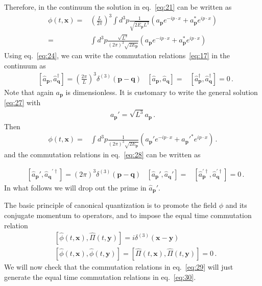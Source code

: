 \begin{frame}
Therefore, in the continuum the solution in eq.~\eqref{eq:21} can be written as
\begin{align}
\label{eq:27}
  \phi(t,\mathbf{x})=&\left(\frac{L}{2\pi}\right)^3\int d^3p \frac{1}{\sqrt{2E_\mathbf{p} L^3}}
  \left(a_\mathbf{p} e^{-i p\cdot x }+a_\mathbf{p}^* e^{i p\cdot x }\right)\nonumber\\
=&\int d^3p \frac{\sqrt{L^3}}{(2\pi)^3\sqrt{2E_\mathbf{p} }}
  \left(a_\mathbf{p} e^{-i p\cdot x }+a_\mathbf{p}^* e^{i p\cdot x }\right)
\end{align}
Using eq.~\eqref{eq:24}, we can write the commutation relations~\eqref{eq:17} in the continuum as
\begin{align}
\label{eq:28}
  &\left[\widehat{a}_\mathbf{p},\widehat{a}_\mathbf{q}^\dagger\right]=
\left(\frac{2\pi}{L}\right)^3\delta^{(3)}(\mathbf{p}-\mathbf{q})
&\left[\widehat{a}_\mathbf{p},\widehat{a}_\mathbf{q}\right]=&
\left[\widehat{a}_\mathbf{p}^\dagger,\widehat{a}_\mathbf{q}^\dagger\right]=0\,.
\end{align}
Note that again $a_{\mathbf{p}}$ is dimensionless. It is customary to write the general solution \eqref{eq:27} with
\begin{align}
  a_{\mathbf{p}}'=\sqrt{L^3}a_{\mathbf{p}}\,.
\end{align}
Then
\begin{align}
  \phi(t,\mathbf{x})=&\int d^3p \frac{1}{(2\pi)^3\sqrt{2E_\mathbf{p} }}
  \left(a_\mathbf{p}' e^{-i p\cdot x }+{a_\mathbf{p}'}^* e^{i p\cdot x }\right)\,.
\end{align}
and the commutation relations in eq.~\eqref{eq:28} can be written as

\begin{align}
\label{eq:29}
  &\left[\widehat{a}_{\mathbf{p}}',{\widehat{a}_{\mathbf{q}}}^{\prime \dagger}\right]=
\left(2\pi\right)^3\delta^{(3)}(\mathbf{p}-\mathbf{q})
&\left[\widehat{a}_{\mathbf{p}}',\widehat{a}_{\mathbf{q}}'\right]=&
\left[\widehat{a}_\mathbf{p}^{\prime\dagger},\widehat{a}_\mathbf{q}^{\prime\dagger}\right]=0\,.
\end{align}
In what follows we will drop out the prime in $\widehat{a}_{\mathbf{p}}'$.


The basic principle of canonical quantization is to promote the field $\phi$ and its conjugate momentum to operators, and to impose the equal time commutation relation
\begin{align}
  \label{eq:30}
  &\left[\widehat{\phi}(t,\mathbf{x}),\widehat{\Pi}(t,\mathbf{y})\right]=
  i\delta^{(3)}(\mathbf{x}-\mathbf{y})\nonumber\\
  &\left[\widehat{\phi}(t,\mathbf{x}),\widehat{\phi}(t,\mathbf{y})\right]=
  \left[\widehat{\Pi}(t,\mathbf{x}),\widehat{\Pi}(t,\mathbf{y})\right]=
  0\,.
\end{align}
We will now check that the commutation relations in eq.~\eqref{eq:29} will just generate the equal time commutation relations in eq.~\eqref{eq:30}.


\end{frame}

